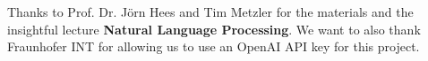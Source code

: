 

{
    Thanks to Prof. Dr. Jörn Hees and Tim Metzler for the materials and the insightful lecture \textbf{Natural Language Processing}.\newline
    We want to also thank Fraunhofer INT for allowing us to use an OpenAI API key for this project.
}

